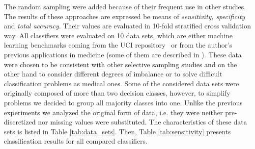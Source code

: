 \documentclass{AIMeth05}
\begin{document}
The random sampling were added because of their frequent use in other
studies. The results of these approaches are expressed be means of {\em
sensitivity, specificity} and {\em total accuracy}. Their values are
evaluated in 10-fold stratified cross validation way. All classifiers were
evaluated on 10 data sets, which are either machine learning benchmarks
coming from the UCI repository~\cite{irvine} or from the author's previous
applications in medicine  (some of them are described in \cite{Stef01hab}).
These data were chosen to be consistent with other selective sampling
studies \cite{Batista,KubMat,Lav} and on the other hand to consider
different degrees of imbalance or to solve difficult classification problems
as medical ones. Some of the considered data sets were originally composed
of more than two decision classes, however, to simplify problems we decided
to group all majority classes into one. Unlike the previous experiments
\cite{GrzymJSW} we analyzed the original form of data, i.e. they were
neither pre-discretized nor missing values were substituted.  The
characteristics of these data sets is listed in Table \ref{tab:data_sets}.
Then, Table \ref{tab:sensitivity} presents classification results for all
compared classifiers.
\end{document}
